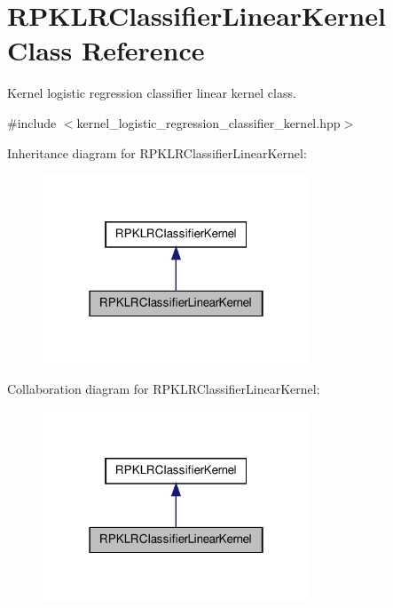 \hypertarget{class_r_p_k_l_r_classifier_linear_kernel}{\section{\-R\-P\-K\-L\-R\-Classifier\-Linear\-Kernel \-Class \-Reference}
\label{class_r_p_k_l_r_classifier_linear_kernel}
}


\-Kernel logistic regression classifier linear kernel class.  




{\ttfamily \#include $<$kernel\-\_\-logistic\-\_\-regression\-\_\-classifier\-\_\-kernel.\-hpp$>$}



\-Inheritance diagram for \-R\-P\-K\-L\-R\-Classifier\-Linear\-Kernel\-:\nopagebreak
\begin{figure}[H]
\begin{center}
\leavevmode
\includegraphics[width=226pt]{class_r_p_k_l_r_classifier_linear_kernel__inherit__graph}
\end{center}
\end{figure}


\-Collaboration diagram for \-R\-P\-K\-L\-R\-Classifier\-Linear\-Kernel\-:\nopagebreak
\begin{figure}[H]
\begin{center}
\leavevmode
\includegraphics[width=226pt]{class_r_p_k_l_r_classifier_linear_kernel__coll__graph}
\end{center}
\end{figure}

